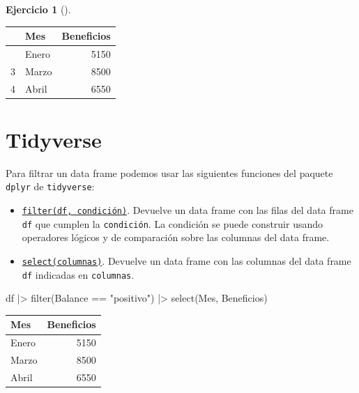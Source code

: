 \documentclass[
  a4paper,
]{scrreport}
\newenvironment{Shaded}{\begin{snugshade}}{\end{snugshade}}
\newcommand{\FunctionTok}[1]{\textcolor[rgb]{0.28,0.35,0.67}{#1}}
\newcommand{\NormalTok}[1]{\textcolor[rgb]{0.00,0.23,0.31}{#1}}
\newcommand{\SpecialCharTok}[1]{\textcolor[rgb]{0.37,0.37,0.37}{#1}}
\newcommand{\StringTok}[1]{\textcolor[rgb]{0.13,0.47,0.30}{#1}}
\providecommand{\tightlist}{%
  \setlength{\itemsep}{0pt}\setlength{\parskip}{0pt}}\usepackage{longtable,booktabs,array}
\theoremstyle{definition}
\newtheorem{exercise}{Ejercicio}[chapter]
\theoremstyle{remark}
\begin{document}
\begin{exercise}[]
\begin{enumerate}
\begin{tcolorbox}
  \begin{longtable}[]{@{}llr@{}}
  \toprule\noalign{}
  & Mes & Beneficios \\
  \midrule\noalign{}
  \endhead
  \bottomrule\noalign{}
  \endlastfoot
  1 & Enero & 5150 \\
  3 & Marzo & 8500 \\
  4 & Abril & 6550 \\
  \end{longtable}

  \section{Tidyverse}

  Para filtrar un data frame podemos usar las siguientes funciones del
  paquete \texttt{dplyr} de \texttt{tidyverse}:

  \begin{itemize}
  \tightlist
  \item
    \href{https://dplyr.tidyverse.org/reference/filter.html}{\texttt{filter(df,\ condición)}}.
    Devuelve un data frame con las filas del data frame \texttt{df} que
    cumplen la \texttt{condición}. La condición se puede construir
    usando operadores lógicos y de comparación sobre las columnas del
    data frame.
  \item
    \href{https://dplyr.tidyverse.org/reference/select.html}{\texttt{select(columnas)}}.
    Devuelve un data frame con las columnas del data frame \texttt{df}
    indicadas en \texttt{columnas}.
  \end{itemize}

\begin{Shaded}
\begin{Highlighting}[]
\NormalTok{df }\SpecialCharTok{|\textgreater{}}
    \FunctionTok{filter}\NormalTok{(Balance }\SpecialCharTok{==} \StringTok{"positivo"}\NormalTok{) }\SpecialCharTok{|\textgreater{}} 
    \FunctionTok{select}\NormalTok{(Mes, Beneficios)}
\end{Highlighting}
\end{Shaded}

  \begin{longtable}[]{@{}lr@{}}
  \toprule\noalign{}
  Mes & Beneficios \\
  \midrule\noalign{}
  \endhead
  \bottomrule\noalign{}
  \endlastfoot
  Enero & 5150 \\
  Marzo & 8500 \\
  Abril & 6550 \\
  \end{longtable}


\end{tcolorbox}
\end{enumerate}
\end{exercise}
\end{document}
